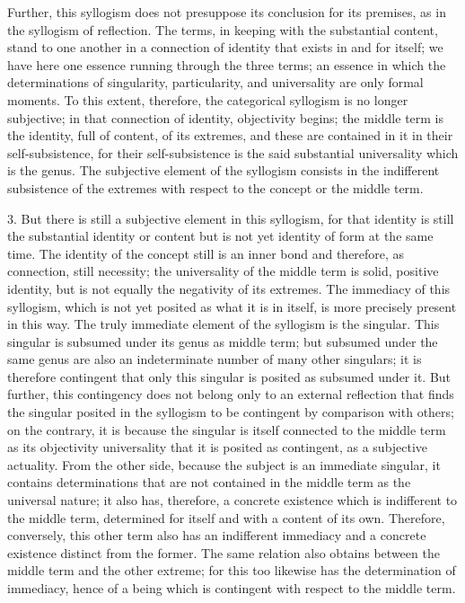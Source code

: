 Further, this syllogism does not presuppose
its conclusion for its premises,
as in the syllogism of reflection.
The terms, in keeping with the substantial content,
stand to one another in a connection of identity
that exists in and for itself;
we have here one essence running through the three terms;
an essence in which the determinations of
singularity, particularity, and universality
are only formal moments.
To this extent, therefore,
the categorical syllogism is no longer subjective;
in that connection of identity, objectivity begins;
the middle term is the identity,
full of content, of its extremes,
and these are contained in it in their
self-subsistence,
for their self-subsistence is
the said substantial universality
which is the genus.
The subjective element of the syllogism
consists in the indifferent subsistence
of the extremes with respect to the concept
or the middle term.

3. But there is still a subjective element in this syllogism,
for that identity is still the substantial identity
or content but is not yet identity of form at the same time.
The identity of the concept still is an inner bond
and therefore, as connection, still necessity;
the universality of the middle term is
solid, positive identity,
but is not equally the negativity of its extremes.
The immediacy of this syllogism,
which is not yet posited as what it is in itself,
is more precisely present in this way.
The truly immediate element
of the syllogism is the singular.
This singular is subsumed under its genus as middle term;
but subsumed under the same genus are also
an indeterminate number of many other singulars;
it is therefore contingent that only this singular
is posited as subsumed under it.
But further, this contingency does not belong
only to an external reflection
that finds the singular posited in
the syllogism to be contingent
by comparison with others;
on the contrary, it is because the singular
is itself connected to the middle term
as its objectivity universality
that it is posited as contingent,
as a subjective actuality.
From the other side,
because the subject is an immediate singular,
it contains determinations that are not
contained in the middle term as the universal nature;
it also has, therefore, a concrete existence
which is indifferent to the middle term,
determined for itself and with a content of its own.
Therefore, conversely, this other term also has
an indifferent immediacy and a concrete existence
distinct from the former.
The same relation also obtains between
the middle term and the other extreme;
for this too likewise has the determination of immediacy,
hence of a being which is contingent
with respect to the middle term.

